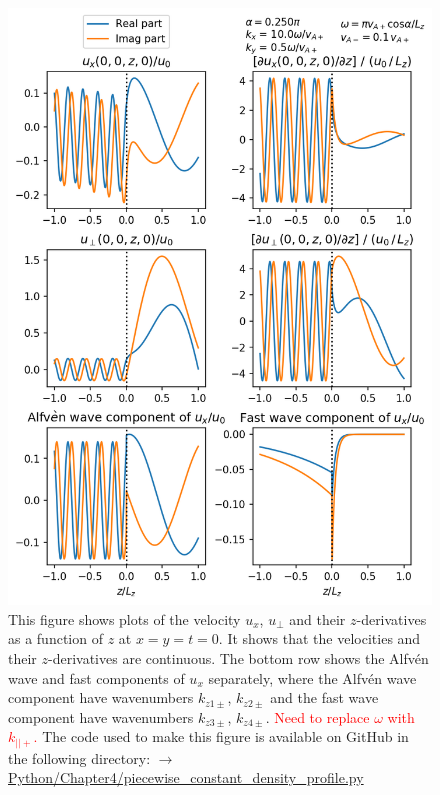 \begin{figure}
    \centering
    \vspace{-20pt}
    \includegraphics[width=\textwidth,height=0.85\textheight,keepaspectratio]{figures/chapter04/piecewise_constant_density_profile.png}
    \vspace{-10pt}
    \caption{This figure shows plots of the velocity $u_x$, $u_\perp$ and their $z$-derivatives as a function of $z$ at $x=y=t=0$. It shows that the velocities and their $z$-derivatives are continuous. The bottom row shows the Alfv\'en wave and fast components of $u_x$ separately, where the Alfv\'en wave component have wavenumbers $k_{z1\pm}$, $k_{z2\pm}$ and the fast wave component have wavenumbers $k_{z3\pm}$, $k_{z4\pm}$. \textcolor{red}{Need to replace $\omega$ with $k_{||+}$.} The code used to make this figure is available on GitHub in the following directory:\newline
    \href{https://github.com/aleksyprok/apkp_thesis/blob/main/Python/Chapter4/piecewise_constant_density_profile.py}{$\rightarrow$ Python/Chapter4/piecewise\_constant\_density\_profile.py}}
    \vspace{-20pt}
    \label{fig:piecewise_constant_density_profile}
\end{figure}

